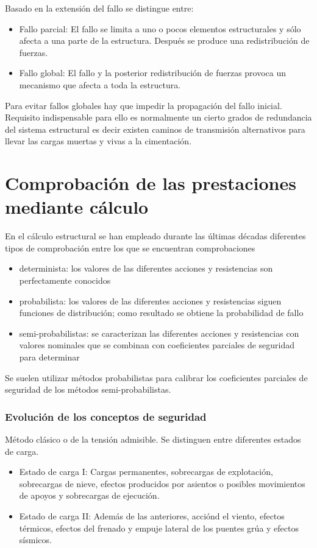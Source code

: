 Basado en la extensión del fallo se distingue entre:
\begin{itemize}
    \item Fallo parcial: El fallo se limita a uno o pocos elementos estructurales y sólo afecta a una parte de la estructura. Después se produce una redistribución de fuerzas.
    \item Fallo global: El fallo y la posterior redistribución de fuerzas provoca un mecanismo que afecta a toda la estructura.
\end{itemize}

Para evitar fallos globales hay que impedir la propagación del fallo inicial. Requisito indispensable para ello es normalmente un cierto grados de redundancia del sistema estructural es decir existen caminos de transmisión alternativos para llevar las cargas muertas y vivas a la cimentación.

\section{Comprobación de las prestaciones mediante cálculo}

En el cálculo estructural se han empleado durante las últimas décadas diferentes tipos de comprobación entre los que se encuentran comprobaciones
\begin{itemize}
    \item determinista: los valores de las diferentes acciones y resistencias son perfectamente conocidos
    \item probabilista: los valores de las diferentes acciones y resistencias siguen funciones de distribución; como resultado se obtiene la probabilidad de fallo
    \item semi-probabilistas: se caracterizan las diferentes acciones y resistencias con valores nominales que se combinan con coeficientes parciales de seguridad para determinar
\end{itemize}
Se suelen utilizar métodos probabilistas para calibrar los coeficientes parciales de seguridad de los métodos semi-probabilistas.

\subsubsection{Evolución de los conceptos de seguridad}
Método clásico o de la tensión admisible.
Se distinguen entre diferentes estados de carga.
\begin{itemize}
    \item Estado de carga I: Cargas permanentes, sobrecargas de explotación, sobrecargas de nieve, efectos producidos por asientos o posibles movimientos de apoyos y sobrecargas de ejecución.
    \item Estado de carga II: Además de las anteriores, acciónd el viento, efectos térmicos, efectos del frenado y empuje lateral de los puentes grúa y efectos sísmicos.
\end{itemize}

